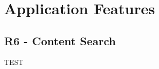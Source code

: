\documentclass{article}
\begin{document}
\section*{Application Features}
    \subsection*{R6 - Content Search}

        TEST
\end{document}
